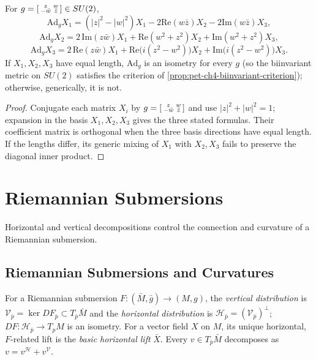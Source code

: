 \begin{proposition}
  \label{prop:pet-ch4-berger-adjoint-action}
  For $g=\begin{bsmallmatrix}z&w\\-\bar w&\bar z\end{bsmallmatrix}\in SU(2)$,
  \[
    \mathrm{Ad}_gX_1=(|z|^2-|w|^2)X_1-2\mathrm{Re}(w\bar z)X_2-2\mathrm{Im}(w\bar z)X_3,
  \]
  \[
    \mathrm{Ad}_gX_2=2\,\mathrm{Im}(z\bar w)X_1+\mathrm{Re}(w^2+z^2)X_2+\mathrm{Im}(w^2+z^2)X_3,
  \]
  \[
    \mathrm{Ad}_gX_3=2\,\mathrm{Re}(z\bar w)X_1+\mathrm{Re}\big(i(z^2-w^2)\big)X_2+\mathrm{Im}\big(i(z^2-w^2)\big)X_3.
  \]
  If $X_1,X_2,X_3$ have equal length, $\mathrm{Ad}_g$ is an isometry for every
  $g$ (so the biinvariant metric on $SU(2)$ satisfies the criterion of
  \cref{prop:pet-ch4-biinvariant-criterion}); otherwise, generically, it is
  not.
\end{proposition}
\begin{proof}
  \sketch
  Conjugate each matrix $X_i$ by
  $g=\begin{bsmallmatrix}z&w\\-\bar w&\bar z\end{bsmallmatrix}$ and use
  $|z|^2+|w|^2=1$; expansion in the basis $X_1,X_2,X_3$ gives the three stated
  formulas. Their coefficient matrix is orthogonal when the three basis
  directions have equal length. If the lengths differ, its generic mixing of
  $X_1$ with $X_2,X_3$ fails to preserve the diagonal inner product.
\end{proof}

\section{Riemannian Submersions}

Horizontal and vertical decompositions control the connection and curvature of a
Riemannian submersion.

\subsection{Riemannian Submersions and Curvatures}

\begin{definition}
  \label{def:pet-ch4-vertical-horizontal-distribution}
  For a Riemannian submersion $F:(\bar M,\bar g)\to(M,g)$, the \emph{vertical
  distribution} is $\mathcal V_{\bar p}=\ker DF_{\bar p}\subset T_{\bar p}\bar M$
  and the \emph{horizontal distribution} is $\mathcal H_{\bar p}=(\mathcal V_{\bar p})^\perp$;
  $DF:\mathcal H_{\bar p}\to T_pM$ is an isometry. For a vector field $X$ on
  $M$, its unique horizontal, $F$-related lift is the \emph{basic horizontal
  lift} $\bar X$. Every $v\in T_{\bar p}\bar M$ decomposes as $v=v^{\mathcal H}+v^{\mathcal V}$.
\end{definition}

